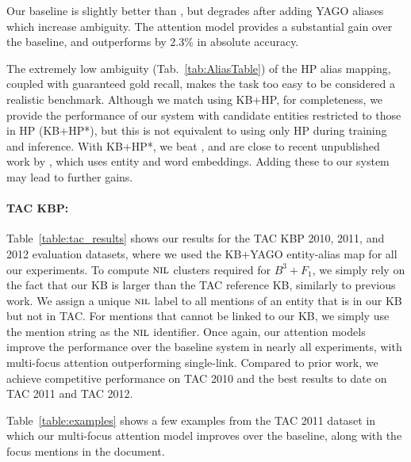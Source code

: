 Our baseline is slightly better than , but degrades
after adding YAGO aliases which increase ambiguity.
The attention model provides a substantial gain over
the baseline, and outperforms  by
2.3\% in absolute accuracy.

The extremely low ambiguity (Tab.~\ref{tab:AliasTable}) of the HP
alias mapping, coupled with guaranteed gold recall, makes the task too
easy to be considered a realistic benchmark.  Although we match
 using KB+HP, for completeness, we provide the
performance of our system with candidate entities restricted to those
in HP (KB+HP*), but this is not equivalent to using only HP during
training and inference.  With KB+HP*, we beat ,
and are close to recent unpublished work by ,
which uses entity and word embeddings.  Adding these to our system may
lead to further gains.


\paragraph*{TAC KBP:}
Table~\ref{table:tac_results} shows our results for the TAC KBP 2010, 2011, and 2012
evaluation datasets, where we used the KB+YAGO entity-alias map for all our experiments. 
To compute $\mbox{\textsc{nil}}$ clusters required for $B^3+F_1$, we simply rely on the fact that our KB is larger than the TAC
reference KB, similarly to previous work. We assign a unique $\mbox{\textsc{nil}}$ label to
all mentions of an entity that is in our KB but not in TAC.  For mentions that cannot be linked
to our KB, we simply use the mention string as the $\mbox{\textsc{nil}}$ identifier.
Once again, our attention models improve the performance over the baseline
system in nearly all experiments, with multi-focus attention outperforming single-link. Compared to
prior work, we achieve competitive performance on TAC 2010 and the best
results to date on TAC 2011 and TAC 2012. 

Table~\ref{table:examples} shows a few examples from the TAC 2011 dataset in which
 our multi-focus attention model
improves over the baseline, along with the focus mentions in the document.

